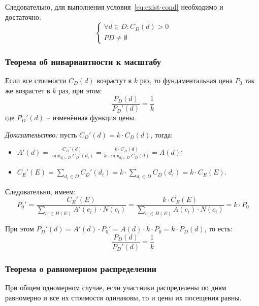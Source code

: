 Следовательно, для выполнения условия~\ref{eq:exist-cond} необходимо и достаточно:
\begin{equation}
	\begin{cases}
		\forall d \in D: C_D(d) > 0 \\
		PD \ne \emptyset
	\end{cases}
\end{equation}

\subsubsection{Теорема об инвариантности к масштабу}

Если все стоимости $C_D(d)$ возрастут в $k$ раз, то фундаментальная цена $P_0$ так же возрастет в $k$ раз, при этом:
\begin{equation}
	\frac{P_D(d)}{P_D'(d)} = \frac{1}{k}
\end{equation}
где $P_D'(d)$ -- изменённая функция цены.

\textit{Доказательство:} пусть $C_D'(d) = k \cdot C_D(d)$, тогда:
\begin{itemize}[label=--]
	\item $A'(d) = \frac{C_D'(d)}{\min_{d_i \in D}{C_D'(d_i)}} = \frac{k \cdot C_D(d)}{k \cdot \min_{d_i \in D}{C_D(d)}} = A(d)$;
	\item $C_E'(E) = \sum_{d_i \in D}{C_D'(d_i)} = k \cdot \sum_{d_i \in D}{C_D(d_i)} = k \cdot C_E(E)$.
\end{itemize}

Следовательно, имеем:
\begin{equation}
	P_0' = \frac{C_E'(E)}{\sum_{c_i \in H(E)}{A'(c_i) \cdot N(c_i)}} = \frac{k \cdot C_E(E)}{\sum_{c_i \in H(E)}{A(c_i) \cdot N(c_i)}} = k \cdot P_0
\end{equation}

При этом $P_D'(d) = A'(d) \cdot P_0' = A(d) \cdot k \cdot P_0 = k \cdot P_D(d)$, то есть:
\begin{equation}
	\frac{P_D(d)}{P_D'(d)} = \frac{1}{k}
\end{equation}

\subsubsection{Теорема о равномерном распределении}

При общем одномерном случае, если участники распределены по дням равномерно и все их стоимости одинаковы, то и цены их посещения равны.

